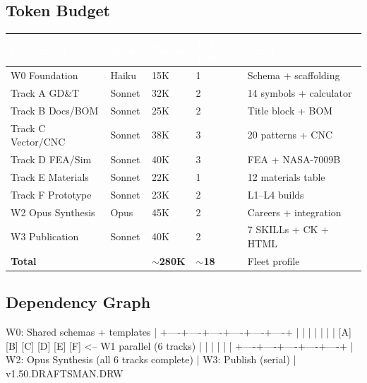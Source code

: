 \documentclass[11pt,letterpaper]{article}
\newcommand{\tableheader}[1]{\textbf{\sffamily\textcolor{white}{#1}}}
\begin{document}
\subsection{Token Budget}

\begin{center}
\begin{tabularx}{\textwidth}{L{4cm}C{2cm}C{2cm}C{2cm}X}
\toprule
{}
\tableheader{Component} & \tableheader{Model} & \tableheader{Tokens} & \tableheader{Ctx Win} & \tableheader{Notes} \\
\midrule
W0 Foundation & Haiku & 15K & 1 & Schema + scaffolding \\
Track A GD\&T & Sonnet & 32K & 2 & 14 symbols + calculator \\
Track B Docs/BOM & Sonnet & 25K & 2 & Title block + BOM \\
Track C Vector/CNC & Sonnet & 38K & 3 & 20 patterns + CNC \\
Track D FEA/Sim & Sonnet & 40K & 3 & FEA + NASA-7009B \\
Track E Materials & Sonnet & 22K & 1 & 12 materials table \\
Track F Prototype & Sonnet & 23K & 2 & L1--L4 builds \\
W2 Opus Synthesis & Opus & 45K & 2 & Careers + integration \\
W3 Publication & Sonnet & 40K & 2 & 7 SKILLs + CK + HTML \\
\midrule
\textbf{Total} & & \textbf{$\sim$280K} & \textbf{$\sim$18} & Fleet profile \\
\bottomrule
\end{tabularx}
\end{center}

\subsection{Dependency Graph}

\begin{asciibox}
W0: Shared schemas + templates
      |
      +----+----+----+----+----+----+
      |    |    |    |    |    |    |
     [A]  [B]  [C]  [D]  [E] [F]   <-- W1 parallel (6 tracks)
      |    |    |    |    |    |
      +----+----+----+----+----+
                   |
                  W2: Opus Synthesis (all 6 tracks complete)
                   |
                  W3: Publish (serial)
                   |
              v1.50.DRAFTSMAN.DRW
\end{asciibox}
\end{document}
